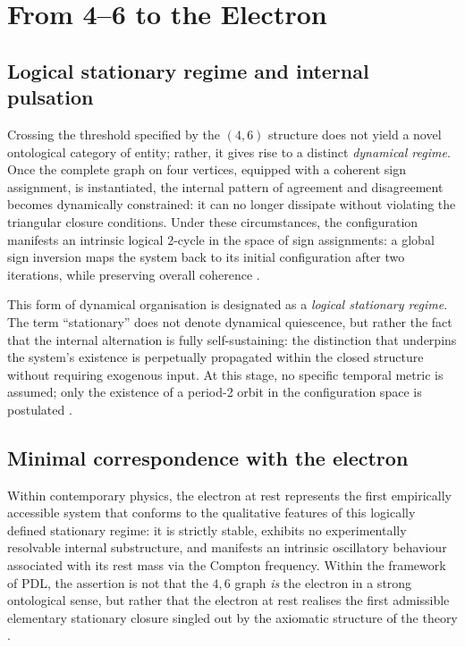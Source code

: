 \documentclass{article}
\begin{document}
\section{From 4--6 to the Electron}
\label{sec:four_six_electron}

\subsection{Logical stationary regime and internal pulsation}
\label{subsec:logical_stationary}

Crossing the threshold specified by the \((4,6)\) structure does not yield a novel ontological category of entity; rather, it gives rise to a distinct \emph{dynamical regime}. Once the complete graph on four vertices, equipped with a coherent sign assignment, is instantiated, the internal pattern of agreement and disagreement becomes dynamically constrained: it can no longer dissipate without violating the triangular closure conditions. Under these circumstances, the configuration manifests an intrinsic logical 2-cycle in the space of sign assignments: a global sign inversion maps the system back to its initial configuration after two iterations, while preserving overall coherence
\citep{PDL_Main_2026,PDL_intro}.

This form of dynamical organisation is designated as a \emph{logical stationary regime}. The term “stationary” does not denote dynamical quiescence, but rather the fact that the internal alternation is fully self-sustaining: the distinction that underpins the system’s existence is perpetually propagated within the closed structure without requiring exogenous input. At this stage, no specific temporal metric is assumed; only the existence of a period-2 orbit in the configuration space is postulated
\citep{PDL_Main_2026,PDL_position}.

\subsection{Minimal correspondence with the electron}
\label{subsec:electron_correspondence}

Within contemporary physics, the electron at rest represents the first empirically accessible system that conforms to the qualitative features of this logically defined stationary regime: it is strictly stable, exhibits no experimentally resolvable internal substructure, and manifests an intrinsic oscillatory behaviour associated with its rest mass via the Compton frequency. Within the framework of PDL, the assertion is not that the \(4,6\) graph \emph{is} the electron in a strong ontological sense, but rather that the electron at rest realises the first admissible elementary stationary closure singled out by the axiomatic structure of the theory \citep{PDL_Main_2026,PDL_intro}.
\end{document}
